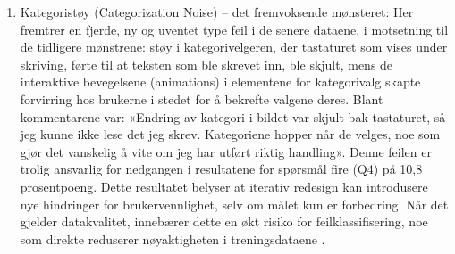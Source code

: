 \begin{enumerate}
    \item Kategoristøy (Categorization Noise) – det fremvoksende mønsteret: Her fremtrer en fjerde, ny og uventet type feil i de senere dataene, i motsetning til de tidligere mønstrene: støy i kategorivelgeren, der tastaturet som vises under skriving, førte til at teksten som ble skrevet inn, ble skjult, mens de interaktive bevegelsene (animations) i elementene for kategorivalg skapte forvirring hos brukerne i stedet for å bekrefte valgene deres. Blant kommentarene var: «Endring av kategori i bildet var skjult bak tastaturet, så jeg kunne ikke lese det jeg skrev. Kategoriene hopper når de velges, noe som gjør det vanskelig å vite om jeg har utført riktig handling». Denne feilen er trolig ansvarlig for nedgangen i resultatene for spørsmål fire (Q4) på 10,8 prosentpoeng. Dette resultatet belyser at iterativ redesign kan introdusere nye hindringer for brukervennlighet, selv om målet kun er forbedring. Når det gjelder datakvalitet, innebærer dette en økt risiko for feilklassifisering, noe som direkte reduserer nøyaktigheten i treningsdataene \cite{geiger2021}.
\end{enumerate}


